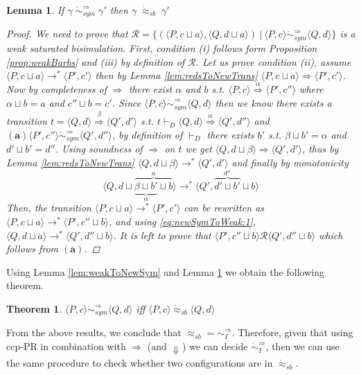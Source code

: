\documentclass[copyright,creativecommons]{eptcs}
\newcommand{\rrarrow}{\longrightarrow}
\newcommand{\pairccp}[2]{\langle #1,#2 \rangle}
\newcommand{\wbarb}[1]{\Downarrow_{#1}}
\newcommand{\wsatbis}{\dot{\approx}_{sb}}
\newtheorem{theorem}{Theorem}
\newtheorem{lemma}{Lemma}
\newcommand{\newtrans}[1]{\stackrel{#1}{\Longrightarrow}}
\newcommand{\reds}{\rrarrow^*}
\newcommand{\R}{\mathcal{R}}
\newcommand{\A}{\alpha}
\newcommand{\B}{\beta}
\newcommand{\G}{\gamma}
\newcommand{\conf}[2]{\pairccp{#1}{#2}}
\newcommand{\deriv}{\vdash_D}
\newcommand{\redstransition}[4]{\conf{#1}{#2} \reds \conf{#3}{#4}}
\newcommand{\newtransition}[5]{\conf{#1}{#2} \newtrans{#3} \conf{#4}{#5}}
\newcommand{\lub}{\sqcup}
\newcommand{\rel}[4]{\conf{#1}{#2} \R \conf{#3}{#4}}
\newcommand{\newirrbis}{\dot{\sim}^{\newtrans{}}_{I}}
\newcommand{\newsymbis}{\dot{\sim}^{\newtrans{}}_{sym}}
\begin{document}
\begin{lemma}
\label{lem:newSymToWeak}
If $\G \; \newsymbis \; \G'$ then $\G \; \wsatbis \; \G'$
\begin{proof}
 We need to prove that $\R = \{ (\conf{P}{c \lub a}, \conf{Q}{d \lub a}) \ |\ \conf{P}
{c} \newsymbis \conf{Q}{d}\}$ is a weak saturated bisimulation. First, condition (i)
follows form Proposition \ref{prop:weakBarbs} and (iii) by definition of $\R$. Let us
prove condition (ii), assume $\conf{P}{c \lub a} \reds \conf{P'}{c'}$ then by Lemma \ref{lem:redsToNewTrans}
$\newtransition{P}{c \lub a}{}{P'}{c'}$.
Now by completeness of $\newtrans{}$ there exist $\A$ and $b$ s.t.
$\newtransition{P}{c}{\A}{P'}{c''}$ where $\A \lub b = a$ and $c'' \lub b = c'$.
Since $\conf{P}{c} \newsymbis \conf{Q}{d}$ then we know there exists a
transition $t = \newtransition{Q}{d}{\B}{Q'}{d'}$ s.t. $t \deriv \newtransition{Q}{d}
{\A}{Q'}{d''}$ and $\mathbf{(a)} \conf{P'}{c''} \newsymbis \conf{Q'}{d''}$, by definition of
$\deriv$ there exists $b'$ s.t. $\B \lub b' = \A$ and $d' \lub b' = d''$.
Using soundness of $\newtrans{}$ on $t$ we get $\newtransition{Q}{d
\lub \B}{}{Q'}{d'}$, thus by Lemma \ref{lem:redsToNewTrans} $\conf{Q}{d \lub \B} \reds
\conf{Q'}{d'}$ and finally by monotonicity
\begin{equation}
\label{eq:newSymToWeak:1}
\conf{Q}{d \lub \overbrace{\underbrace{\B \lub b'}_\A \lub b}^a} \reds \conf{Q'}{\overbrace{d' \lub b'}^{d''} \lub b}
\end{equation}
Then, the transition $\redstransition{P}{c \lub a}{P'}{c'}$ can be
rewritten as $\redstransition{P}{c \lub a}{P'}{c'' \lub b}$, and using
\eqref{eq:newSymToWeak:1}, $\redstransition{Q}{d \lub a}{Q'}{d'' \lub b}$. It is left to prove
that $\rel{P'}{c'' \lub b}{Q'}{d'' \lub b}$ which follows from $\mathbf{(a)}$.
\end{proof}
\end{lemma}


Using Lemma \ref{lem:weakToNewSym} and Lemma \ref{lem:newSymToWeak} we obtain
the following theorem.

\begin{theorem}
\label{th:weakSimEqNewSym}
$\conf{P}{c} \newsymbis \conf{Q}{d}$ iff $\conf{P}{c} \wsatbis \conf{Q}{d}$
\end{theorem}

From the above results, we conclude that $\wsatbis = \newirrbis$.
Therefore, given that using ccp-PR in combination with $\newtrans{}$ (and $\wbarb{}$)
we can decide $\newirrbis$, then we can use the same procedure to check
whether two configurations are in $\wsatbis$.
\end{document}
